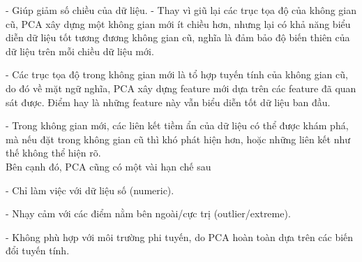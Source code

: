 \documentclass[12pt,a4paper,oneside]{report}
\numberwithin{equation}{section}
\begin{document}
- Giúp giảm số chiều của dữ liệu. - Thay vì giũ lại các trục tọa độ của không gian cũ, PCA xây dựng một không gian mới ít chiều hơn, nhưng lại có khả năng biểu diễn dữ liệu tốt tương đương không gian cũ, nghĩa là đảm bảo độ biến thiên của dữ liệu trên mỗi chiều dữ liệu mới.

- Các trục tọa độ trong không gian mới là tổ hợp tuyến tính của không gian cũ, do đó về mặt ngữ nghĩa, PCA xây dựng feature mới dựa trên các feature đã quan sát được. Điểm hay là những feature này vẫn biểu diễn tốt dữ liệu ban đầu.

- Trong không gian mới, các liên kết tiềm ẩn của dữ liệu có thể được khám phá, mà nếu đặt trong không gian cũ thì khó phát hiện hơn, hoặc những liên kết như thế không thể hiện rõ.\\
Bên cạnh đó, PCA cũng có một vài hạn chế sau

- Chỉ làm việc với dữ liệu số (numeric).

- Nhạy cảm với các điểm nằm bên ngoài/cực trị (outlier/extreme).

- Không phù hợp với môi trường phi tuyến, do PCA hoàn toàn dựa trên các biến đổi tuyến tính.
\end{document}
